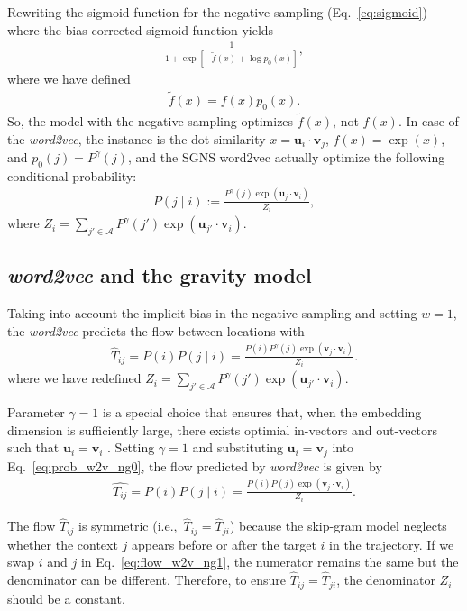 \documentclass[12pt,a4paper]{article}
\def\given{\mid}
\def\ie{i.e.,~}
\begin{document}
Rewriting the sigmoid function for the negative sampling (Eq.~\ref{eq:sigmoid}) where the bias-corrected sigmoid function yields
\begin{align}
	\label{eq:sigmoid3}
	\frac{1}{1 + \exp\left[ - \tilde f(x) + \log p_0(x)  \right]},
\end{align}
where we have defined
\begin{align}
	\label{eq:unnormalized}
	\tilde f(x) = f(x) p_0(x).
\end{align}
So, the model with the negative sampling optimizes $\tilde f(x)$, not $f(x)$. In case of the {\it word2vec}, the instance is the dot similarity $x=\bm{u}_i \cdot \bm{v}_j$,  $f(x)=\exp(x)$, and $p_0(j)=P^\gamma(j)$, and the SGNS word2vec actually optimize the following conditional probability:
\begin{align}
	P\left(j \given i \right):= \frac{P^\gamma (j)\exp(\bm{u}_j \cdot \bm{v}_{i})}{Z_i},
	\label{eq:real_cond}
\end{align}
where $Z_i=\sum_{j' \in \mathcal{A}} P^\gamma (j') \exp(\bm{u}_{j'} \cdot \bm{v}_{i})$.


\subsection{\textit{word2vec} and the gravity model}

Taking into account the implicit bias in the negative sampling  and setting $w=1$, the \textit{word2vec} predicts the flow between locations with
\begin{align}
	\hat{T}_{ij}= P(i) P(j\given i) = \frac{P(i)P^\gamma (j)\exp(\bm{v}_j \cdot \bm{v}_{i})}{Z_i}. \label{eq:prob_w2v_ng0}
\end{align}
where we have redefined $Z_i=\sum_{j' \in \mathcal{A}} P^ \gamma (j') \exp(\bm{u}_{j'} \cdot \bm{v}_{i})$.

Parameter $\gamma=1$ is a special choice that ensures that, when the embedding dimension is sufficiently large, there exists optimial in-vectors and out-vectors such that $\bm{u}_i = \bm{v}_i$ \autocite{levy2014neural}.
Setting $\gamma = 1$ and substituting $\bm{u}_i = \bm{v}_j$ into Eq.~\ref{eq:prob_w2v_ng0}, the flow predicted by {\it word2vec} is given by
\begin{align}
	\hat{T_{ij}}= P(i) P(j\given i) = \frac{P(i)P(j)\exp(\bm{v}_j \cdot \bm{v}_{i})}{Z_i}. \label{eq:flow_w2v_ng1}
\end{align}

The flow $\hat{T}_{ij}$ is symmetric (\ie $\hat{T}_{ij}=\hat{T}_{ji}$) because the skip-gram model neglects whether the context $j$ appears before or after the target $i$ in the trajectory.
If we swap $i$ and $j$ in Eq.~\ref{eq:flow_w2v_ng1}, the numerator remains the same but the denominator can be different.
Therefore, to ensure $\hat{T}_{ij} = \hat{T}_{ji}$, the denominator $Z_i$ should be a constant.
\end{document}
